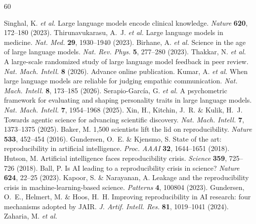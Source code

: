 \documentclass[sn-nature]{sn-jnl}
\begin{document}

\begin{thebibliography}{60}

Singhal, K. \emph{et al.}
Large language models encode clinical knowledge.
\emph{Nature} \textbf{620}, 172--180 (2023).
Thirunavukarasu, A.~J. \emph{et al.}
Large language models in medicine.
\emph{Nat. Med.} \textbf{29}, 1930--1940 (2023).
Birhane, A. \emph{et al.}
Science in the age of large language models.
\emph{Nat. Rev. Phys.} \textbf{5}, 277--280 (2023).
Thakkar, N. \emph{et al.}
A large-scale randomized study of large language model feedback in peer review.
\emph{Nat. Mach. Intell.} \textbf{8} (2026). Advance online publication.
Kumar, A. \emph{et al.}
When large language models are reliable for judging empathic communication.
\emph{Nat. Mach. Intell.} \textbf{8}, 173--185 (2026).
Serapio-Garc\'{i}a, G. \emph{et al.}
A psychometric framework for evaluating and shaping personality traits in large language models.
\emph{Nat. Mach. Intell.} \textbf{7}, 1954--1968 (2025).
Xin, H., Kitchin, J.~R. \& Kulik, H.~J.
Towards agentic science for advancing scientific discovery.
\emph{Nat. Mach. Intell.} \textbf{7}, 1373--1375 (2025).
Baker, M.
1,500 scientists lift the lid on reproducibility.
\emph{Nature} \textbf{533}, 452--454 (2016).
Gundersen, O.~E. \& Kjensmo, S.
State of the art: reproducibility in artificial intelligence.
\emph{Proc. AAAI} \textbf{32}, 1644--1651 (2018).
Hutson, M.
Artificial intelligence faces reproducibility crisis.
\emph{Science} \textbf{359}, 725--726 (2018).
Ball, P.
Is AI leading to a reproducibility crisis in science?
\emph{Nature} \textbf{624}, 22--25 (2023).
Kapoor, S. \& Narayanan, A.
Leakage and the reproducibility crisis in machine-learning-based science.
\emph{Patterns} \textbf{4}, 100804 (2023).
Gundersen, O.~E., Helmert, M. \& Hoos, H.~H.
Improving reproducibility in AI research: four mechanisms adopted by JAIR.
\emph{J. Artif. Intell. Res.} \textbf{81}, 1019--1041 (2024).
Zaharia, M. \emph{et al.}

\end{thebibliography}
\end{document}
